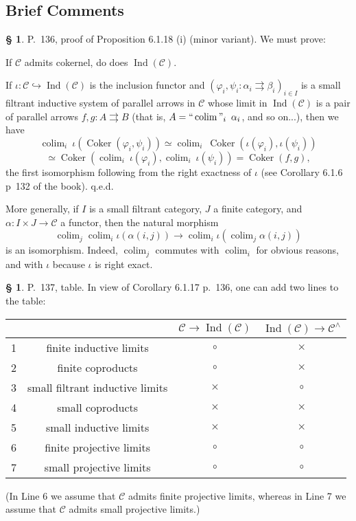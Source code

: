 \documentclass[12pt]{article}%
\theoremstyle{remark}
\theoremstyle{definition}
\newtheorem{s}[thm]{\S}%
\newcommand{\nn}{\noindent}
\newcommand{\C}{\mathcal C}
\newcommand{\pp}{\varphi}
\newcommand{\parar}{\rightrightarrows}
\DeclareMathOperator*{\colim}{colim}%
\DeclareMathOperator*{\ic}{``\colim"}
\DeclareMathOperator{\Coker}{Coker}
\DeclareMathOperator{\Ind}{Ind}
\begin{document}

\subsection{Brief Comments}

\begin{s} 
P.~136, proof of Proposition 6.1.18 (i) (minor variant). We must prove:

If $\C$ admits cokernel, do does $\Ind(\C)$.

If $\iota:\C\hookrightarrow\Ind(\C)$ is the inclusion functor and $(\pp_i,\psi_i:\alpha_i\parar\beta_i)_{i\in I}$ is a small filtrant inductive system of parallel arrows in $\C$ whose limit in $\Ind(\C)$ is a pair of parallel arrows $f,g:A\parar B$ (that is, $A=\ic_i\ \alpha_i$, and so on...), then we have 
$$
\colim_i\ \iota(\Coker(\pp_i,\psi_i))\simeq
\colim_i\ \Coker(\iota(\pp_i),\iota(\psi_i))
$$
$$
\simeq
\Coker(\colim_i\ \iota(\pp_i),\colim_i\ \iota(\psi_i))=
\Coker(f,g),
$$ 
the first isomorphism following from the right exactness of $\iota$ (see Corollary 6.1.6 p~132 of the book). q.e.d.

More generally, if $I$ is a small filtrant category, $J$ a finite category, and $\alpha:I\times J\to\C$ a functor, then the natural morphism 
$$
\colim_j\colim_i\iota(\alpha(i,j))\to\colim_i\iota\left(\colim_j\alpha(i,j)\right) 
$$ 
is an isomorphism. Indeed, $\colim_j$ commutes with $\colim_i$ for obvious reasons, and with $\iota$ because $\iota$ is right exact.
\end{s}

%

\begin{s} 
P.~137, table. In view of Corollary 6.1.17 p.~136, one can add two lines to the table:\bigskip 

\begin{center}
\begin{tabular}{|c|c|c|c|}\hline
&&$\C\to\Ind(\C)$&$\Ind(\C)\to\C^\wedge$\\ \hline
1&finite inductive limits&$\circ$&$\times$\\ \hline
2&finite coproducts&$\circ$&$\times$\\ \hline
3&small filtrant inductive limits&$\times$&$\circ$\\ \hline
4&small coproducts&$\times$&$\times$\\ \hline
5&small inductive limits&$\times$&$\times$\\ \hline
6&finite projective limits&$\circ$&$\circ$\\ \hline
7&small projective limits&$\circ$&$\circ$\\ \hline
\end{tabular}
\end{center}%
\nn(In Line 6 we assume that $\C$ admits finite projective limits, whereas in Line 7 we assume that $\C$ admits small projective limits.)%
\end{s}
\end{document}

